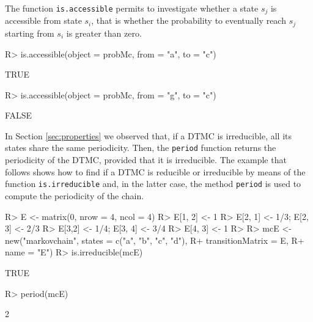 \documentclass[
  nojss]{jss}
\begin{document}
The function \texttt{is.accessible} permits to investigate whether a state \(s_{j}\) is accessible from state \(s_i\), that is whether the probability to eventually reach \(s_j\) starting from \(s_{i}\) is greater than zero.

\begin{CodeChunk}

\begin{CodeInput}
R> is.accessible(object = probMc, from = "a", to = "c")
\end{CodeInput}

\begin{CodeOutput}
[1] TRUE
\end{CodeOutput}

\begin{CodeInput}
R> is.accessible(object = probMc, from = "g", to = "c")
\end{CodeInput}

\begin{CodeOutput}
[1] FALSE
\end{CodeOutput}
\end{CodeChunk}

In Section \ref{sec:properties} we observed that, if a DTMC is irreducible, all its states share the same periodicity. Then, the \texttt{period} function returns the periodicity of the DTMC, provided that it is irreducible. The example that follows shows how to find if a DTMC is reducible or irreducible by means of the function \texttt{is.irreducible} and, in the latter case, the method \texttt{period} is used to compute the periodicity of the chain.

\begin{CodeChunk}

\begin{CodeInput}
R> E <- matrix(0, nrow = 4, ncol = 4)
R> E[1, 2] <- 1
R> E[2, 1] <- 1/3; E[2, 3] <- 2/3
R> E[3,2] <- 1/4; E[3, 4] <- 3/4
R> E[4, 3] <- 1
R> 
R> mcE <- new("markovchain", states = c("a", "b", "c", "d"), 
R+      transitionMatrix = E, 
R+      name = "E")
R> is.irreducible(mcE)
\end{CodeInput}

\begin{CodeOutput}
[1] TRUE
\end{CodeOutput}

\begin{CodeInput}
R> period(mcE)
\end{CodeInput}

\begin{CodeOutput}
[1] 2
\end{CodeOutput}
\end{CodeChunk}
\end{document}
